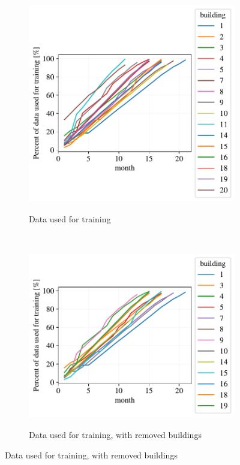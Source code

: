 \begin{figure}[H]
	\begin{subfigure}{.5\textwidth}
        \caption{Data used for training}
        \includegraphics[width=1\textwidth]{Figures/EC/DYN/data_used_for_training_all.pdf}
        \label{fig:data_used_for_training}
    \end{subfigure}
    ~
    \begin{subfigure}{.5\textwidth}
        \caption{Data used for training, with removed buildings}
        \includegraphics[width=1\textwidth]{Figures/EC/DYN/data_used_for_training_removed_short.pdf}
        \label{fig:data_used_for_training_removed}
    \end{subfigure}
\end{figure}

